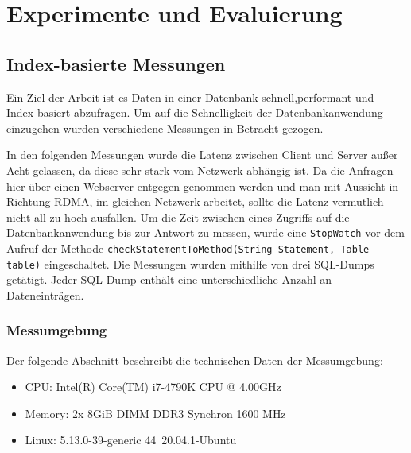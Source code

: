 \chapter{Experimente und Evaluierung}
\label{Evaluierung}
\section{Index-basierte Messungen}

Ein Ziel der Arbeit ist es Daten in einer Datenbank schnell,performant und Index-basiert abzufragen.
Um auf die Schnelligkeit der Datenbankanwendung einzugehen wurden verschiedene Messungen in Betracht gezogen.

In den folgenden Messungen wurde die Latenz zwischen Client und Server außer Acht gelassen, da diese sehr stark vom Netzwerk abhängig ist. Da die Anfragen hier über einen Webserver entgegen genommen werden und man mit Aussicht in Richtung RDMA, im gleichen Netzwerk arbeitet, sollte die Latenz vermutlich nicht all zu hoch ausfallen.
Um die Zeit zwischen eines Zugriffs auf die Datenbankanwendung bis zur Antwort zu messen, wurde eine \texttt{StopWatch} vor dem Aufruf der Methode \texttt{checkStatementToMethod(String Statement, Table table)} eingeschaltet.
Die Messungen wurden mithilfe von drei SQL-Dumps getätigt. Jeder SQL-Dump enthält eine unterschiedliche Anzahl an Dateneinträgen.

\subsection{Messumgebung}
Der folgende Abschnitt beschreibt die technischen Daten der Messumgebung:

\begin{itemize}
 \item CPU: Intel(R) Core(TM) i7-4790K CPU @ 4.00GHz
 \item Memory: 2x 8GiB DIMM DDR3 Synchron 1600 MHz
 \item Linux: 5.13.0-39-generic 44~20.04.1-Ubuntu
\end{itemize}



